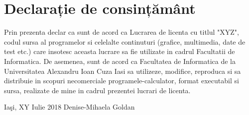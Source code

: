 \chapter*{\large {Declarație de consințământ}}

Prin prezenta declar ca sunt de acord ca Lucrarea de licenta cu titlul "XYZ", codul  sursa  al  programelor  si  celelalte  continuturi  (grafice,  multimedia,  date  de  test  etc.)  care insotesc aceasta lucrare sa fie utilizate in cadrul Facultatii de Informatica.
De  asemenea,  sunt  de  acord  ca Facultatea de Informatica  de  la  Universitatea  Alexandru  Ioan  Cuza Iasi sa utilizeze, modifice, reproduca si sa distribuie in scopuri necomerciale programele-calculator, format executabil si sursa, realizate de mine in cadrul prezentei lucrari de licenta.

\hfill \break
\hfill \break

Iaşi, XY Iulie 2018 \hfill Denise-Mihaela Goldan\\

\clearpage